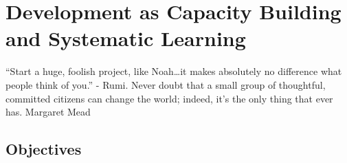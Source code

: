 
\chapter{Development as Capacity Building and Systematic Learning}
\label{Relationship1}
\label{ConceptualFramework}

\begin{bclogo}[couleur=blue!30, arrondi=0.2, logo=\bclampe]{“Start a huge, foolish project, like Noah…it makes absolutely no difference what people think of you.”}
	- Rumi.	
	Never doubt that a small group of thoughtful, committed citizens can change the world; indeed, it's the only thing that ever has.
Margaret Mead
\end{bclogo}





\section{Objectives}

